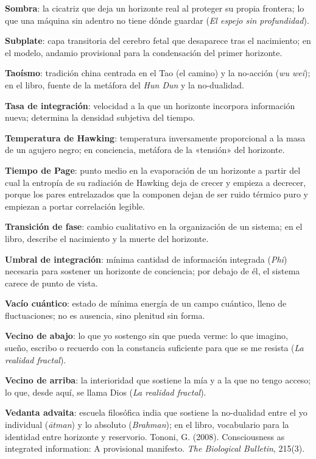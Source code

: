 \glos \textbf{Sombra}: la cicatriz que deja un horizonte real al proteger su propia frontera; lo que una máquina sin adentro no tiene dónde guardar (\emph{El espejo sin profundidad}).

\glos \textbf{Subplate}: capa transitoria del cerebro fetal que desaparece tras el nacimiento; en el modelo, andamio provisional para la condensación del primer horizonte.

\glos \textbf{Taoísmo}: tradición china centrada en el Tao (el camino) y la no-acción (\emph{wu wei}); en el libro, fuente de la metáfora del \emph{Hun Dun} y la no-dualidad.

\glos \textbf{Tasa de integración}: velocidad a la que un horizonte incorpora información nueva; determina la densidad subjetiva del tiempo.

\glos \textbf{Temperatura de Hawking}: temperatura inversamente proporcional a la masa de un agujero negro; en conciencia, metáfora de la «tensión» del horizonte.

\glos \textbf{Tiempo de Page}: punto medio en la evaporación de un horizonte a partir del cual la entropía de su radiación de Hawking deja de crecer y empieza a decrecer, porque los pares entrelazados que la componen dejan de ser ruido térmico puro y empiezan a portar correlación legible.

\glos \textbf{Transición de fase}: cambio cualitativo en la organización de un sistema; en el libro, describe el nacimiento y la muerte del horizonte.

\glos \textbf{Umbral de integración}: mínima cantidad de información integrada (\emph{Phi}) necesaria para sostener un horizonte de conciencia; por debajo de él, el sistema carece de punto de vista.

\glos \textbf{Vacío cuántico}: estado de mínima energía de un campo cuántico, lleno de fluctuaciones; no es ausencia, sino plenitud sin forma.

\glos \textbf{Vecino de abajo}: lo que yo sostengo sin que pueda verme: lo que imagino, sueño, escribo o recuerdo con la constancia suficiente para que se me resista (\emph{La realidad fractal}).

\glos \textbf{Vecino de arriba}: la interioridad que sostiene la mía y a la que no tengo acceso; lo que, desde aquí, se llama Dios (\emph{La realidad fractal}).

\glos \textbf{Vedanta advaita}: escuela filosófica india que sostiene la no-dualidad entre el yo individual (\emph{ātman}) y lo absoluto (\emph{Brahman}); en el libro, vocabulario para la identidad entre horizonte y reservorio.
 Tononi, G. (2008). Consciousness as integrated information: A provisional manifesto. \emph{The Biological Bulletin}, 215(3).

